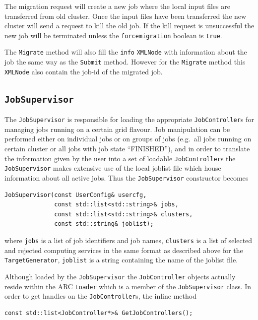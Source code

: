 \documentclass{book}
\newcommand{\JobController}{\texttt{JobController}}
\newcommand{\JobSupervisor}{\texttt{JobSupervisor}}
\newcommand{\Loader}{\texttt{Loader}}
\newcommand{\TargetGenerator}{\texttt{TargetGenerator}}
\newcommand{\XMLNode}{\texttt{XMLNode}}
\begin{document}
The migration request will create a new job where the local input files are 
transferred from old cluster. Once the input files have been transferred the 
new cluster will send a request to kill the old job. If the kill request is 
unsuccessful the new job will be terminated unless the \texttt{forcemigration} 
boolean is \texttt{true}.

The \texttt{Migrate} method will also fill the \texttt{info} {\XMLNode} with 
information about the job the same way as the \texttt{Submit} method. However 
for the \texttt{Migrate} method this \texttt{XMLNode} also contain the job-id 
of the migrated job.

\subsection{{\JobSupervisor}}

The {\JobSupervisor} is responsible for loading the appropriate
{\JobController}s for managing jobs running on a certain grid
flavour. Job manipulation can be performed either on individual jobs
or on groups of jobs (e.g.\ all jobs running on certain cluster or all
jobs with job state ``FINISHED''), and in order to translate the
information given by the user into a set of loadable {\JobController}s
the {\JobSupervisor} makes extensive use of the local joblist file
which house information about all active jobs. Thus the {\JobSupervisor}
constructor becomes

\begin{shaded}
\begin{verbatim}
JobSupervisor(const UserConfig& usercfg,
              const std::list<std::string>& jobs,
              const std::list<std::string>& clusters,
              const std::string& joblist);
\end{verbatim}
\end{shaded}

where \texttt{jobs} is a list of job identifiers and job names,
\texttt{clusters} is a list of selected and rejected computing
services in the same format as described above for the
{\TargetGenerator}, \texttt{joblist} is a string containing the name
of the joblist file.

Although loaded by the {\JobSupervisor} the {\JobController}
objects actually reside within the ARC {\Loader} which is a member of
the {\JobSupervisor} class. In order to get handles on the
{\JobController}s, the inline method

\begin{shaded}
\begin{verbatim}
const std::list<JobController*>& GetJobControllers();
\end{verbatim}
\end{shaded}
\end{document}
